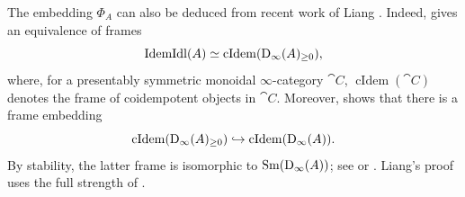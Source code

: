 \documentclass{amsart}
\begin{document}
    \begin{Rem}
        The embedding $\Phi_A$ can also be deduced from recent work of Liang \cite{Liang2026Generalized}. Indeed, \cite[Theorem 7.8]{Liang2026Generalized} gives an equivalence of frames
        \[
        \mathrm{IdemIdl}(A) \simeq \operatorname{cIdem}(\operatorname{D}_{\infty}(A)_{\ge 0}),
        \]
        where, for a presentably symmetric monoidal $\infty$-category $\cat C$, $\operatorname{cIdem}(\cat C)$ denotes the frame of coidempotent objects in $\cat C$. Moreover, \cite[Proposition 3.9]{Liang2026Generalized} shows that there is a frame embedding
        \[
        \operatorname{cIdem}(\operatorname{D}_{\infty}(A)_{\ge 0}) \hookrightarrow \operatorname{cIdem}(\operatorname{D}_{\infty}(A)).
        \]
    By stability, the latter frame is isomorphic to $\operatorname{Sm}(\operatorname{D}_{\infty}(A))$; see \cite{BalmerFavi2011Generalized} or \cite[Section 2]{Aoki2025Sheaves}. Liang's proof uses the full strength of \cite{hebestreit2024note}. 
    \end{Rem}
\end{document}
